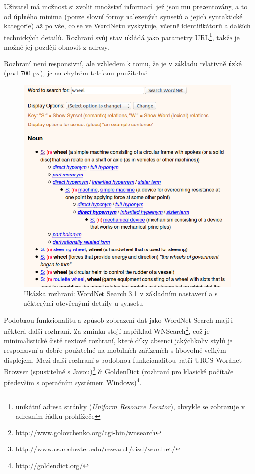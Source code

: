 \documentclass[a4paper, 11pt, oneside]{book}
\begin{document}
				Uživatel má možnost si zvolit množství informací, jež jsou mu prezentovány, a to od úplného minima (pouze slovní formy nalezených synsetů a jejich syntaktické kategorie) až po vše, co se ve WordNetu vyskytuje, včetně identifikátorů a dalších technických detailů. Rozhraní svůj stav ukládá jako parametry URL\footnote{unikátní adresa stránky (\textit{Uniform Resource Locator}), obvykle se zobrazuje v adresním řádku prohlížeče}, takže je možné jej později obnovit z adresy.

				Rozhraní není responsivní, ale vzhledem k tomu, že je v základu relativně úzké (pod 700 px), je na chytrém telefonu použitelné.

				\begin{figure}[h]
					\centering
					\includegraphics[width=1.0\textwidth]{wnsearch.png}
					\caption{Ukázka rozhraní: WordNet Search 3.1 v základním nastavení a s některými otevřenými detaily u synsetu}
					\label{fig:wnsearch}
				\end{figure}

				Podobnou funkcionalitu a způsob zobrazení dat jako WordNet Search mají i některá další rozhraní. Za zmínku stojí například WNSearch\footnote{\url{http://www.golovchenko.org/cgi-bin/wnsearch}}, což je minimalistické čistě textové rozhraní, které díky absenci jakýchkoliv stylů je responsivní a dobře použitelné na mobilních zařízeních s libovolně velkým displejem. Mezi další rozhraní s podobnou funkcionalitou patří URCS Wordnet Browser (spustitelné s Javou)\footnote{\url{http://www.cs.rochester.edu/research/cisd/wordnet/}} či GoldenDict (rozhraní pro klasické počítače především s operačním systémem Windows)\footnote{\url{http://goldendict.org/}}.
\end{document}
